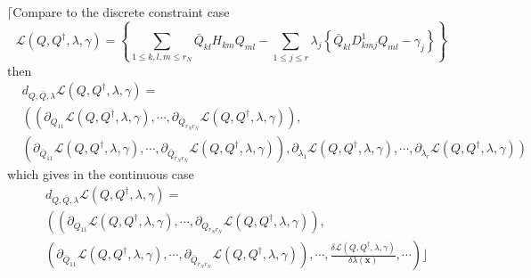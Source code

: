 \documentclass[aps,preprint]{revtex4}%
\begin{document}
$\lceil$Compare to the discrete constraint case
\begin{equation}
\mathcal{L}\left(  Q,Q^{\dagger},\lambda,\gamma\right)  =\left\{  \sum_{1\leq
k,l,m\leq r_{N}}\bar{Q}_{kl}H_{km}Q_{ml}-\sum_{1\leq j\leq r}\lambda
_{j}\left\{  \bar{Q}_{kl}D_{kmj}^{1}Q_{ml}-\gamma_{j}\right\}  \right\}
\end{equation}
then
\begin{align}
&  d_{Q,\bar{Q},\lambda}\mathcal{L}\left(  Q,Q^{\dagger},\lambda
,\gamma\right)  =\nonumber\\
&  \left(  \left(  \partial_{Q_{11}}\mathcal{L}\left(  Q,Q^{\dagger}%
,\lambda,\gamma\right)  ,\cdots,\partial_{Q_{r_{N}r_{N}}}\mathcal{L}\left(
Q,Q^{\dagger},\lambda,\gamma\right)  \right)  ,\right. \nonumber\\
&  \left(  \partial_{\bar{Q}_{11}}\mathcal{L}\left(  Q,Q^{\dagger}%
,\lambda,\gamma\right)  ,\cdots,\partial_{\bar{Q}_{r_{N}r_{N}}}\mathcal{L}%
\left(  Q,Q^{\dagger},\lambda,\gamma\right)  \right)  ,\left.  \partial
_{\lambda_{1}}\mathcal{L}\left(  Q,Q^{\dagger},\lambda,\gamma\right)
,\cdots,\partial_{\lambda_{r}}\mathcal{L}\left(  Q,Q^{\dagger},\lambda
,\gamma\right)  \right)
\end{align}
which gives in the continuous case
\begin{align}
&  d_{Q,\bar{Q},\lambda}\mathcal{L}\left(  Q,Q^{\dagger},\lambda
,\gamma\right)  =\nonumber\\
&  \left(  \left(  \partial_{Q_{11}}\mathcal{L}\left(  Q,Q^{\dagger}%
,\lambda,\gamma\right)  ,\cdots,\partial_{Q_{r_{N}r_{N}}}\mathcal{L}\left(
Q,Q^{\dagger},\lambda,\gamma\right)  \right)  \right.  ,\nonumber\\
&  \left(  \partial_{\bar{Q}_{11}}\mathcal{L}\left(  Q,Q^{\dagger}%
,\lambda,\gamma\right)  ,\cdots,\partial_{\bar{Q}_{r_{N}r_{N}}}\mathcal{L}%
\left(  Q,Q^{\dagger},\lambda,\gamma\right)  \right)  ,\left.  \cdots
,\frac{\delta\mathcal{L}\left(  Q,Q^{\dagger},\lambda,\gamma\right)  }%
{\delta\lambda\left(  \mathbf{x}\right)  },\cdots\right)  \rfloor
\end{align}
\end{document}
